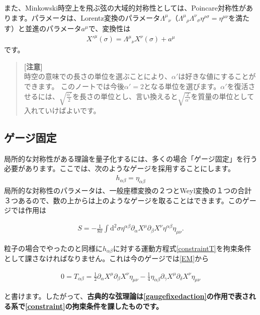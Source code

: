 \documentclass[report,paper=a4, fontsize=12pt, line_length=16cm, number_of_lines=33,dvipdfmx]{jlreq}
\newenvironment{important}{\begin{tcolorbox}[
  colback = white,
  colframe = red!35,
  boxrule = 2mm,
  fonttitle = \bfseries,
  after = \noindent] }{\end{tcolorbox}}
\numberwithin{equation}{chapter}
\numberwithin{equation}{section}
\newcommand{\del}{\partial}
\newcommand{\kyou}[1]{{\sffamily \bfseries #1}}
\newenvironment{remark}{\begin{quote}\small\textbf{[注意]}\\ }{\end{quote}}
\newcommand{\di}{\mathrm{d}}
\begin{document}
また、Minkowski時空上を飛ぶ弦の大域的対称性としては、Poincare対称性があります。パラメータは、Lorentz変換のパラメータ$\Lambda^{\mu}{}_{\nu}$（$\Lambda^{\mu}{}_{\rho}\Lambda^{\nu}{}_{\sigma}\eta^{\rho\sigma}=\eta^{\mu\nu}$を満たす）と並進のパラメータ$a^{\mu}$で、変換性は
\begin{align}
X'^{\mu}(\sigma)=\Lambda^{\mu}{}_{\nu}X^{\nu}(\sigma)+a^{\mu}
\end{align}
です。
\begin{remark}
時空の意味での長さの単位を選ぶことにより、$\alpha'$は好きな値にすることができます。
このノートでは今後$\alpha'=2$となる単位を選びます。$\alpha'$を復活させるには、$\sqrt{\frac{\alpha'}{2}}$を長さの単位とし、言い換えると$\sqrt{\frac{2}{\alpha'}}$を質量の単位として入れていけばよいです。
\end{remark}

\subsection{ゲージ固定}
局所的な対称性がある理論を量子化するには、多くの場合「ゲージ固定」を行う必要があります。ここでは、次のようなゲージを採用することにします。
\begin{align}
h_{\alpha\beta}=\eta_{\alpha\beta}
\end{align}
局所的な対称性のパラメータは、一般座標変換の２つとWeyl変換の１つの合計３つあるので、数の上からは上のようなゲージを取ることはできます。このゲージでは作用は
\begin{important}
  \begin{align}
    S=-\frac{1}{8\pi}\int \di^2\sigma \eta^{\alpha\beta}\del_{\alpha}X^{\mu}\del_{\beta}X^{\nu}\eta^{\alpha\beta}\eta_{\mu\nu}.\label{gaugefixedaction}
    \end{align}      
\end{important}
粒子の場合でやったのと同様に$h_{\alpha\beta}$に対する運動方程式\eqref{constraintT}を拘束条件として課さなければなりません。これは今のゲージでは\eqref{EM}から
\begin{important}
  \begin{align}
    0=T_{\alpha\beta}=
    \frac12 \del_{\alpha}X^{\mu}\del_{\beta}X^{\nu}\eta_{\mu\nu}
    -\frac14 \eta_{\alpha\beta}\del_{\gamma}X^{\mu}\del_{\delta}X^{\nu}\eta_{\mu\nu}\label{constraint}
    \end{align}      
\end{important}
と書けます。したがって、\kyou{古典的な弦理論は\eqref{gaugefixedaction}の作用で表される系で\eqref{constraint}の拘束条件を課したものです。}
\end{document}
